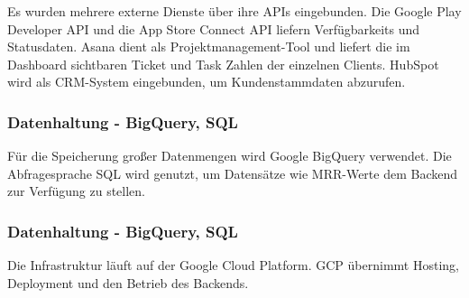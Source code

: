 Es wurden mehrere externe Dienste über ihre APIs eingebunden.
Die Google Play Developer API und die App Store Connect API liefern Verfügbarkeits und Statusdaten.
Asana dient als Projektmanagement-Tool und liefert die im Dashboard sichtbaren Ticket und Task Zahlen der einzelnen Clients.
HubSpot wird als CRM-System eingebunden, um Kundenstammdaten abzurufen.



\subsubsection{Datenhaltung - BigQuery, SQL}

Für die Speicherung großer Datenmengen wird Google BigQuery verwendet.
Die Abfragesprache SQL wird genutzt, um Datensätze wie MRR-Werte dem Backend zur Verfügung zu stellen.



\subsubsection{Datenhaltung - BigQuery, SQL}

Die Infrastruktur läuft auf der Google Cloud Platform.
GCP übernimmt Hosting, Deployment und den Betrieb des Backends.
\newpage